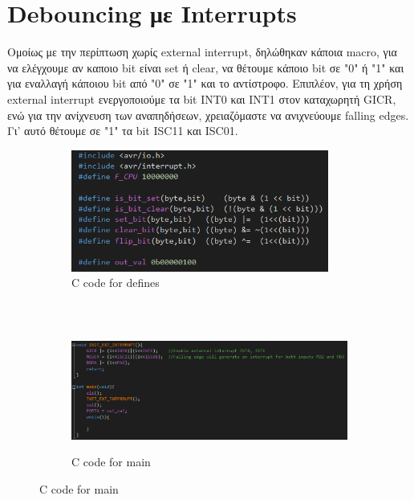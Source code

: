 \documentclass{article}
\begin{document}
\section*{Debouncing με Interrupts}
	Ομοίως με την περίπτωση χωρίς external interrupt, δηλώθηκαν κάποια macro, για να ελέγχουμε αν καποιο bit είναι set ή clear, να θέτουμε κάποιο bit σε "0" ή "1" και για εναλλαγή κάποιου bit από "0" σε "1" και το αντίστροφο. Επιπλέον, για τη χρήση external interrupt ενεργοποιούμε τα bit INT0 και INT1 στον καταχωρητή GICR, ενώ για την ανίχνευση των αναπηδήσεων, χρειαζόμαστε να ανιχνεύουμε falling edges. Γι' αυτό θέτουμε σε "1" τα bit ISC11 και ISC01. 
	\begin{figure}[h!]
		\centering
		\begin{subfigure}[t]{0.5\textwidth}
			\centering
			\includegraphics[height=4cm, width=\linewidth]{./results/lab9_defines_b.png}
			\caption{C code for defines}
		\end{subfigure}%
		~
		\begin{subfigure}[t]{0.5\textwidth}
			\centering
			\includegraphics[height=4cm, width=\linewidth]{./results/lab9_main_b.png}
			\caption{C code for main}
		\end{subfigure}
	\end{figure}
	
\end{document}
